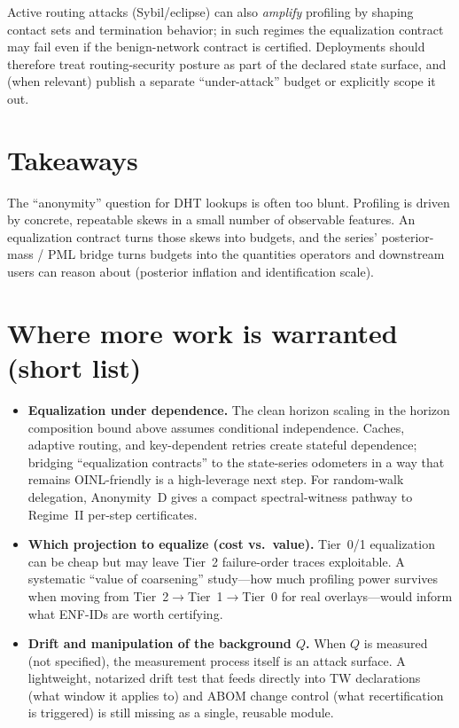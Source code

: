 \documentclass[11pt]{article}
\begin{document}
Active routing attacks (Sybil/eclipse) can also \emph{amplify} profiling by shaping contact sets and termination behavior; in such regimes the equalization contract may fail even if the benign-network contract is certified. Deployments should therefore treat routing-security posture as part of the declared state surface, and (when relevant) publish a separate ``under-attack'' budget or explicitly scope it out.\cite{nettoSybilIPFSDHT2025,cholezSybilIPFSARES2024}

\section{Takeaways}
The ``anonymity'' question for DHT lookups is often too blunt.
Profiling is driven by concrete, repeatable skews in a small number of observable features.
An equalization contract turns those skews into budgets, and the series' posterior-mass / PML bridge turns budgets into the quantities operators and downstream users can reason about (posterior inflation and identification scale).

\section{Where more work is warranted (short list)}
\begin{itemize}[leftmargin=*]
\item \textbf{Equalization under dependence.} The clean horizon scaling in the horizon composition bound above assumes conditional independence.
Caches, adaptive routing, and key-dependent retries create stateful dependence; bridging ``equalization contracts'' to the state-series odometers in a way that remains OINL-friendly is a high-leverage next step. For random-walk delegation, Anonymity~D gives a compact spectral-witness pathway to Regime~II per-step certificates.\cite{series:state1,series:condcert,series:spectral2budget}
\item \textbf{Which projection to equalize (cost vs.\ value).} Tier~0/1 equalization can be cheap but may leave Tier~2 failure-order traces exploitable.
A systematic ``value of coarsening'' study---how much profiling power survives when moving from Tier~2$\to$Tier~1$\to$Tier~0 for real overlays---would inform what ENF-IDs are worth certifying.\cite{series:traceifaces}
\item \textbf{Drift and manipulation of the background $Q$.} When $Q$ is measured (not specified), the measurement process itself is an attack surface.
A lightweight, notarized drift test that feeds directly into TW declarations (what window it applies to) and ABOM change control (what recertification is triggered) is still missing as a single, reusable module.\cite{series:threatwindows,series:accountingrulebook,series:abomoinl}
\end{itemize}
\end{document}

